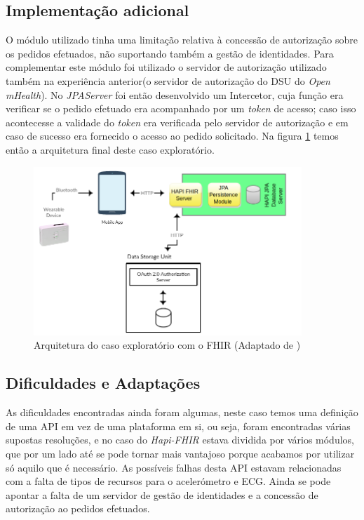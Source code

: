 \subsection{Implementação adicional}
O módulo utilizado tinha uma limitação relativa à concessão de autorização sobre os pedidos efetuados, não suportando também a gestão de identidades. Para complementar este módulo foi utilizado o servidor de autorização utilizado também na experiência anterior(o servidor de autorização do \gls{DSU} do \textit{Open mHealth}).
No \textit{JPAServer} foi então desenvolvido um Intercetor, cuja função era verificar se o pedido efetuado era acompanhado por um \textit{token} de acesso; caso isso acontecesse a validade do \textit{token} era verificada pelo servidor de autorização e em caso de sucesso era fornecido o acesso ao pedido solicitado. Na figura \ref{f:exp-fhir-arch} temos então a arquitetura final deste caso exploratório.
\newpage
\begin{figure}[H]
  \centering
  \includegraphics[width=0.9\textwidth]{imgs/fhir-arch-exp.png}
  \caption[Arquitetura do caso exploratório com o FHIR]{Arquitetura do caso exploratório com o FHIR (Adaptado de \cite{hapi-index})}
  
  \label{f:exp-fhir-arch}
\end{figure}

\subsection{Dificuldades e Adaptações}
As dificuldades encontradas ainda foram algumas, neste caso temos uma definição de uma \gls{API} em vez de uma plataforma em si, ou seja, foram encontradas várias supostas resoluções, e no caso do \textit{Hapi-FHIR} estava dividida por vários módulos, que por um lado até se pode tornar mais vantajoso porque acabamos por utilizar só aquilo que é necessário. As possíveis falhas desta \gls{API} estavam relacionadas com a falta de tipos de recursos para o acelerómetro e \gls{ECG}. Ainda se pode apontar a falta de um servidor de gestão de identidades e a concessão de autorização ao pedidos efetuados.

